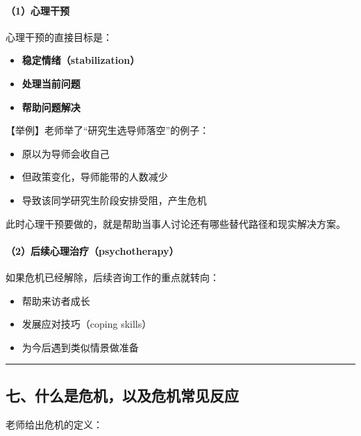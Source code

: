 \documentclass[
  chinese,
  9pt,
  a4paper,
]{ctexart}
\providecommand{\tightlist}{%
  \setlength{\itemsep}{0pt}\setlength{\parskip}{0pt}}
\begin{document}
\paragraph{（1）心理干预}\label{ux5fc3ux7406ux5e72ux9884}

心理干预的直接目标是：

\begin{itemize}
\tightlist
\item
  \textbf{稳定情绪（stabilization）}
\item
  \textbf{处理当前问题}
\item
  \textbf{帮助问题解决}
\end{itemize}

【举例】老师举了``研究生选导师落空''的例子：

\begin{itemize}
\tightlist
\item
  原以为导师会收自己
\item
  但政策变化，导师能带的人数减少
\item
  导致该同学研究生阶段安排受阻，产生危机
\end{itemize}

此时心理干预要做的，就是帮助当事人讨论还有哪些替代路径和现实解决方案。

\paragraph{（2）后续心理治疗（psychotherapy）}\label{ux540eux7eedux5fc3ux7406ux6cbbux7597psychotherapy}

如果危机已经解除，后续咨询工作的重点就转向：

\begin{itemize}
\tightlist
\item
  帮助来访者成长
\item
  发展应对技巧（coping skills）
\item
  为今后遇到类似情景做准备
\end{itemize}

\begin{center}\rule{0.5\linewidth}{0.5pt}\end{center}

\subsection{七、什么是危机，以及危机常见反应}\label{ux4e03ux4ec0ux4e48ux662fux5371ux673aux4ee5ux53caux5371ux673aux5e38ux89c1ux53cdux5e94}

老师给出危机的定义：
\end{document}
